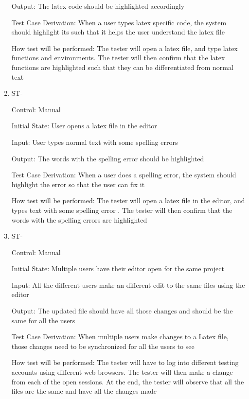 \documentclass[12pt, titlepage]{article}
\newcounter{TESTID}
\newcommand\TESTNUM{\stepcounter{TESTID}\theTESTID}
\begin{document}
\begin{enumerate}
		Output: The latex code should be highlighted accordingly
		
		Test Case Derivation: When a user types latex specific code, the system should highlight its such that it helps the user understand the latex file
		
		How test will be performed: The tester will open a latex file, and type latex functions and environments. The tester will then confirm that the latex functions are highlighted such that they can be differentiated from normal text
		
		\item{ST-\TESTNUM\\}
		
		Control: Manual
		
		Initial State: User opens a latex file in the editor
		
		Input: User types normal text with some spelling errors
		
		Output: The words with the spelling error should be highlighted
		
		Test Case Derivation: When a user does a spelling error, the system should highlight the error so that the user can fix it
		
		How test will be performed: The tester will open a latex file in the editor, and types text with some spelling error . The tester will then confirm that the words with the spelling errors are highlighted
		
		\item{ST-\TESTNUM\\}
		
		Control: Manual
		
		Initial State: Multiple users have their editor open for the same project
		
		Input: All the different users make an different edit to the same files using the editor
		
		Output: The updated file should have all those changes and should be the same for all the users
		
		Test Case Derivation: When multiple users make changes to a Latex file, those changes need to be synchronized for all the users to see
		
		How test will be performed: The tester will have to log into different testing accounts using different web browsers. The tester will then make a change from each of the open sessions. At the end, the tester will observe that all the files are the same and have all the changes made
		

\end{enumerate}
\end{document}
